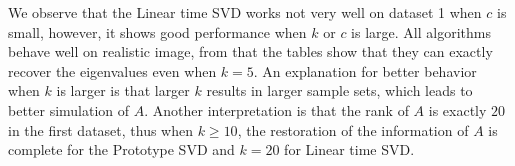 \documentclass{article}
\begin{document}
% 
% 
% 
% 
% 
% 
% 
% 

We observe that the Linear time SVD works not very well on dataset 1 when $c$ is small, however, it shows good performance when $k$ or $c$ is large. All algorithms behave well on realistic image, from that the tables show that they can exactly recover the eigenvalues even when $k=5$. An explanation for better behavior when $k$ is larger is that larger $k$ results in larger sample sets, which leads to better simulation of $A$. Another interpretation is that the rank of $A$ is exactly $20$ in the first dataset, thus when $k\ge 10$, the restoration of the information of $A$ is complete for the Prototype SVD and $k=20$ for Linear time SVD.
\end{document}
